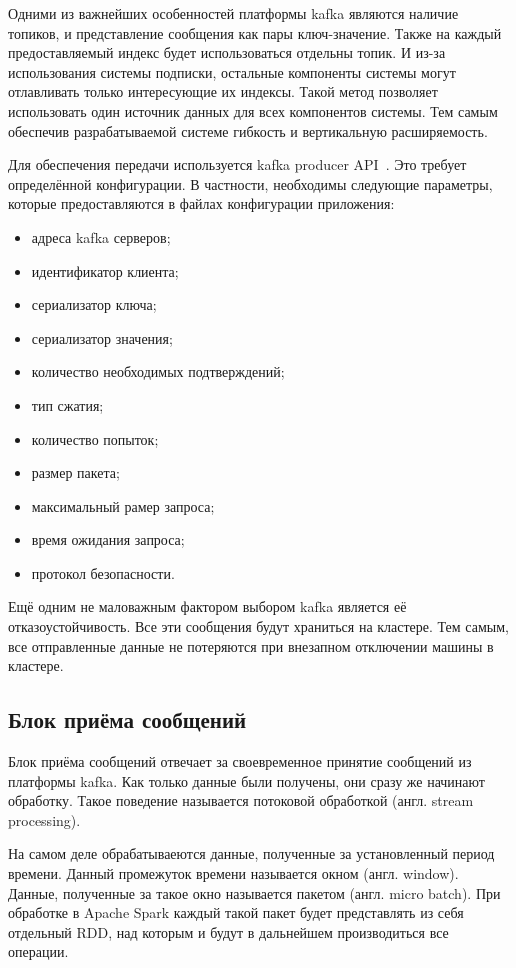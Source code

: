 Одними из важнейших особенностей платформы kafka являются наличие топиков, и представление сообщения как пары ключ-значение.
Также на каждый предоставляемый индекс будет использоваться отдельны топик.
И из-за использования системы подписки, остальные компоненты системы могут отлавливать только интересующие их индексы.
Такой метод позволяет использовать один источник данных для всех компонентов системы.
Тем самым обеспечив разрабатываемой системе гибкость и вертикальную расширяемость.

Для обеспечения передачи используется kafka producer API~\cite{kafka_python_producer_api}.
Это требует определённой конфигурации.
В частности, необходимы следующие параметры, которые предоставляются в файлах конфигурации приложения:

\begin{itemize}
    \item адреса kafka серверов;
    \item идентификатор клиента;
    \item сериализатор ключа;
    \item сериализатор значения;
    \item количество необходимых подтверждений;
    \item тип сжатия;
    \item количество попыток;
    \item размер пакета;
    \item максимальный рамер запроса;
    \item время ожидания запроса;
    \item протокол безопасности.
\end{itemize}


Ещё одним не маловажным фактором выбором kafka является её отказоустойчивость.
Все эти сообщения будут храниться на кластере.
Тем самым, все отправленные данные не потеряются при внезапном отключении машины в кластере.

\subsection{Блок приёма сообщений}

Блок приёма сообщений отвечает за своевременное принятие сообщений из платформы kafka.
Как только данные были получены, они сразу же начинают обработку.
Такое поведение называется потоковой обработкой (англ. stream processing).

На самом деле обрабатываеются данные, полученные за установленный период времени.
Данный промежуток времени называется окном (англ. window).
Данные, полученные за такое окно называется пакетом (англ. micro batch).
При обработке в Apache Spark каждый такой пакет будет представлять из себя отдельный RDD, над которым и будут в дальнейшем производиться все операции.

